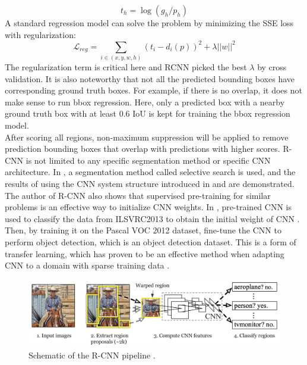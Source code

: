 \begin{equation}
	t_h=\log{(g_h/p_h)} 
\end{equation}
A standard regression model can solve the problem by minimizing the SSE loss with regularization:
\begin{equation}
	\mathcal{L}_{reg} = \sum_{i \in (x,y,w,h)}(t_i-d_i(p))^2 + \lambda||w||^2
\end{equation}
The regularization term is critical here and RCNN picked the best \(\lambda\) by cross validation. It is also noteworthy that not all the predicted bounding boxes have corresponding ground truth boxes. For example, if there is no overlap, it does not make sense to run bbox regression. Here, only a predicted box with a nearby ground truth box with at least 0.6 IoU is kept for training the bbox regression model.
\\After scoring all regions, non-maximum suppression will be applied to remove prediction bounding boxes that overlap with predictions with higher scores. R-CNN is not limited to any specific segmentation method or specific CNN architecture. In \cite{DBLP:journals/corr/GirshickDDM13}, a segmentation method called selective search \cite{6126456} is used, and the results of using the CNN system structure introduced in \cite{10.1145/3065386} and \cite{Simonyan2015VeryDC} are demonstrated.
\\The author of R-CNN also shows that supervised pre-training for similar problems is an effective way to initialize CNN weights. In \cite{DBLP:journals/corr/GirshickDDM13}, pre-trained CNN is used to classify the data from ILSVRC2013 to obtain the initial weight of CNN \cite{DBLP:journals/corr/RussakovskyDSKSMHKKBBF14}. Then, by training it on the Pascal VOC 2012 dataset, fine-tune the CNN to perform object detection, which is an object detection dataset. This is a form of transfer learning, which has proven to be an effective method when adapting CNN to a domain with sparse training data \cite{DBLP:journals/corr/abs-1808-01974}.
\begin{figure}[ht!]
	\centerline{\includegraphics[width=1\textwidth]{Figs/RCNN.png}}
	\caption{Schematic of the R-CNN pipeline \cite{DBLP:journals/corr/GirshickDDM13}.}
	\label{fig:rcnnSche}
\end{figure}
